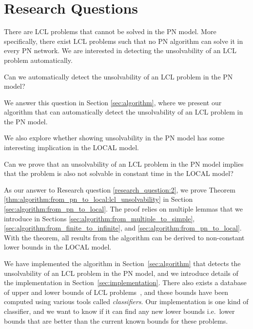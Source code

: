 
\section{Research Questions} \label{sec:research_question}

There are LCL problems that cannot be solved in the PN model.
More specifically, there exist LCL problems such that no PN algorithm can solve it in every PN network.
We are interested in detecting the unsolvability of an LCL problem automatically.

\begin{researchquestion} \label{research_question:1}
Can we automatically detect the unsolvability of an LCL problem in the PN model?
\end{researchquestion}

We answer this question in Section \ref{sec:algorithm}, where we present our algorithm that can automatically detect the unsolvability of an LCL problem in the PN model.

We also explore whether showing unsolvability in the PN model has some interesting implication in the LOCAL model.

\begin{researchquestion} \label{research_question:2}
Can we prove that an unsolvability of an LCL problem in the PN model implies that the problem is also not solvable in constant time in the LOCAL model?
\end{researchquestion}

As our answer to Research question \ref{research_question:2}, we prove Theorem \ref{thm:algorithm:from_pn_to_local:lcl_unsolvability} in Section \ref{sec:algorithm:from_pn_to_local}.
The proof relies on multiple lemmas that we introduce in Sections \ref{sec:algorithm:from_multiple_to_simple}, \ref{sec:algorithm:from_finite_to_infinite}, and \ref{sec:algorithm:from_pn_to_local}.
With the theorem, all results from the algorithm can be derived to non-constant lower bounds in the LOCAL model.

We have implemented the algorithm in Section~\ref{sec:algorithm} that detects the unsolvability of an LCL problem in the PN model, and we introduce details of the implementation in Section~\ref{sec:implementation}.
There also exists a database of upper and lower bounds of LCL problems~\cite{Tereshchenko2021}, and these bounds have been computed using various tools called \emph{classifiers}.
Our implementation is one kind of classifier, and we want to know if it can find any new lower bounds i.e.\ lower bounds that are better than the current known bounds for these problems.

